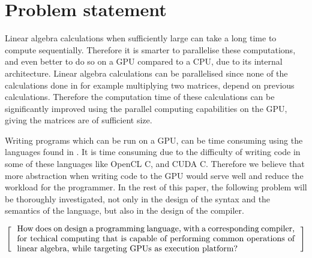 \newpage
\section{Problem statement}

Linear algebra calculations when sufficiently large can take a long time to compute sequentially. 
Therefore it is smarter to parallelise these computations, and even better to do so on a GPU compared to a CPU, due to its internal architecture.
Linear algebra calculations can be parallelised since none of the calculations done in for example multiplying two matrices, depend on previous calculations.
Therefore the computation time of these calculations can be significantly improved using the parallel computing capabilities on the GPU, giving the matrices are of sufficient size.

Writing programs which can be run on a GPU, can be time consuming using the languages found in .
It is time consuming due to the difficulty of writing code in some of these languages like OpenCL C, and CUDA C.
Therefore we believe that more abstraction when writing code to the GPU would serve well and reduce the workload for the programmer.
In the rest of this paper, the following problem will be thoroughly investigated, not only in the design of the syntax and the semantics of the language, but also in the design of the compiler.

\[
  \left[
  \begin{minipage}{\textwidth}
  \centering
  \begin{minipage}{0.96\textwidth}
  How does on design a programming language, with a corresponding compiler, for techical computing that is capable of performing common operations of linear algebra, while targeting GPUs as execution platform?
  
  



  \end{minipage}
  \end{minipage}
    \right]
\]